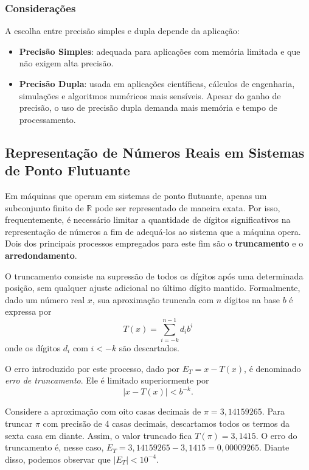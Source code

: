 \subsubsection*{Considerações}

A escolha entre precisão simples e dupla depende da aplicação:

\begin{itemize}
  \item \textbf{Precisão Simples}: adequada para aplicações com memória limitada e que não exigem alta precisão.
  \item \textbf{Precisão Dupla}: usada em aplicações científicas, cálculos de engenharia, simulações e algoritmos numéricos mais sensíveis.
        Apesar do ganho de precisão, o uso de precisão dupla demanda mais memória e tempo de processamento.
\end{itemize}

\subsection{Representação de Números Reais em Sistemas de Ponto Flutuante}

Em máquinas que operam em sistemas de ponto flutuante, apenas um subconjunto
finito de \(\mathbb{R} \) pode ser representado de maneira exata. Por isso,
frequentemente, é necessário limitar a quantidade de dígitos significativos na
representação de números a fim de adequá-los ao sistema que a máquina opera.
Dois dos principais processos empregados para este fim são o
\textbf{truncamento} e o \textbf{arredondamento}.

O truncamento consiste na supressão de todos os dígitos após uma determinada
posição, sem qualquer ajuste adicional no último dígito mantido. Formalmente,
dado um número real \( x \), sua aproximação truncada com \( n \) dígitos na
base \( b \) é expressa por
\[
  T(x) = \sum_{i = -k}^{n-1} d_i b^i
\]
onde os dígitos \( d_i \) com \( i < -k \) são descartados.

O erro introduzido por este processo, dado por $E_T = x-T(x)$, é denominado
\textit{erro de truncamento}. Ele é limitado superiormente por
\begin{equation}
  |x - T(x)| < b^{-k}.
\end{equation}
\begin{ex}
  Considere a aproximação com oito casas decimais de \(\pi = 3,14159265\).
  Para truncar $\pi$  com precisão de 4 casas decimais, descartamos todos os termos da sexta casa em diante. Assim, o valor truncado fica
  $T(\pi) = 3,1415$.
  O erro do truncamento é, nesse caso, $E_T = 3,14159265 - 3,1415 = 0,00009265$. Diante disso, podemos observar que $|E_T| < 10^{-4}$.
\end{ex}

